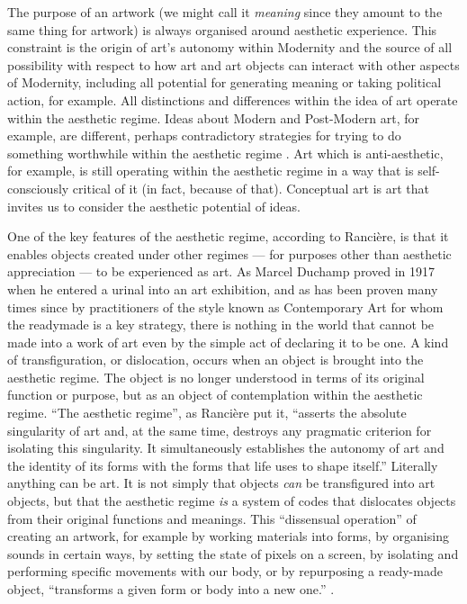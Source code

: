 \documentclass[letterpaper]{article}
\begin{document}
    The purpose of an artwork (we might call it \emph{meaning} since they amount to the same thing for artwork) is always organised around aesthetic experience. This constraint is the origin of art's autonomy within Modernity and the source of all possibility with respect to how art and art objects can interact with other aspects of Modernity, including all potential for generating meaning or taking political action, for example. All distinctions and differences within the idea of art operate within the aesthetic regime. Ideas about Modern and Post-Modern art, for example, are different, perhaps contradictory strategies for trying to do something worthwhile within the aesthetic regime \citep[p213]{ZepkeSblmArt2017}. Art which is anti-aesthetic, for example, is still operating within the aesthetic regime in a way that is self-consciously critical of it (in fact, because of that). Conceptual art is art that invites us to consider the aesthetic potential of ideas.

    One of the key features of the aesthetic regime, according to Rancière, is that it enables objects created under other regimes — for purposes other than aesthetic appreciation — to be experienced as art. As Marcel Duchamp proved in 1917 when he entered a urinal into an art exhibition, and as has been proven many times since by practitioners of the style known as Contemporary Art for whom the readymade is a key strategy, there is nothing in the world that cannot be made into a work of art even by the simple act of declaring it to be one. A kind of transfiguration, or dislocation, occurs when an object is brought into the aesthetic regime. The object is no longer understood in terms of its original function or purpose, but as an object of contemplation within the aesthetic regime. “The aesthetic regime”, as Rancière put it, “asserts the absolute singularity of art and, at the same time, destroys any pragmatic criterion for isolating this singularity. It simultaneously establishes the autonomy of art and the identity of its forms with the forms that life uses to shape itself.” Literally anything can be art. It is not simply that objects \emph{can} be transfigured into art objects, but that the aesthetic regime \emph{is} a system of codes that dislocates objects from their original functions and meanings. This “dissensual operation” of creating an artwork, for example by working materials into forms, by organising sounds in certain ways, by setting the state of pixels on a screen, by isolating and performing specific movements with our body, or by repurposing a ready-made object, “transforms a given form or body into a new one.” \citep[p.54]{RancierThEmncptdSpcttr2009}.
\end{document}

